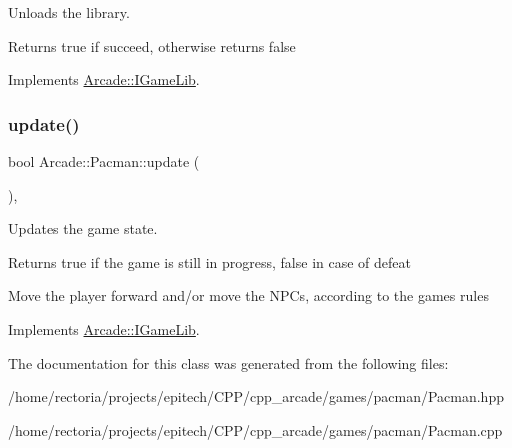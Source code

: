 Unloads the library. 

\begin{DoxyReturn}{Returns}
true if succeed, otherwise returns false 
\end{DoxyReturn}


Implements \hyperlink{class_arcade_1_1_i_game_lib_ab9b7c1bbbea1b86e8515e8fd188fe9cb}{Arcade\+::\+I\+Game\+Lib}.

\mbox{\label{class_arcade_1_1_pacman_aacb11530e954870a6939d91794cbe356}} 
\subsubsection{\texorpdfstring{update()}{update()}}
{\footnotesize\ttfamily bool Arcade\+::\+Pacman\+::update (\begin{DoxyParamCaption}{ }\end{DoxyParamCaption})\hspace{0.3cm}{\ttfamily [final]}, {\ttfamily [virtual]}}



Updates the game state. 

\begin{DoxyReturn}{Returns}
true if the game is still in progress, false in case of defeat
\end{DoxyReturn}
Move the player forward and/or move the N\+P\+Cs, according to the game\textquotesingle{}s rules 

Implements \hyperlink{class_arcade_1_1_i_game_lib_a0be7ffaa269e2fa47146bf27ad2c511a}{Arcade\+::\+I\+Game\+Lib}.



The documentation for this class was generated from the following files\+:\begin{DoxyCompactItemize}
\item 
/home/rectoria/projects/epitech/\+C\+P\+P/cpp\+\_\+arcade/games/pacman/Pacman.\+hpp\item 
/home/rectoria/projects/epitech/\+C\+P\+P/cpp\+\_\+arcade/games/pacman/Pacman.\+cpp\end{DoxyCompactItemize}

